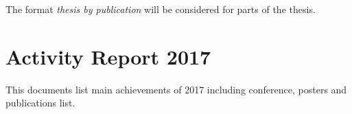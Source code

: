 \documentclass[12pt,]{book}
\theoremstyle{definition}
\theoremstyle{definition}
\theoremstyle{definition}
\theoremstyle{remark}
\begin{document}
The format \emph{thesis by publication} will be considered for parts of
the thesis.

\newpage

\hypertarget{activity-report-2017}{%
\section*{Activity Report 2017}\label{activity-report-2017}}

This documents list main achievements of 2017 including conference,
posters and publications list.




\end{document}
